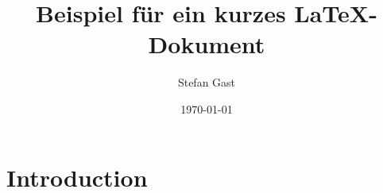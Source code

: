 \documentclass{scrartcl}
\title{Beispiel für ein kurzes \LaTeX-Dokument}
\author{Stefan Gast}
\date{\today}
\begin{document}
	\maketitle
	\tableofcontents

	\clearpage

	\section{Introduction}
	
\end{document}
